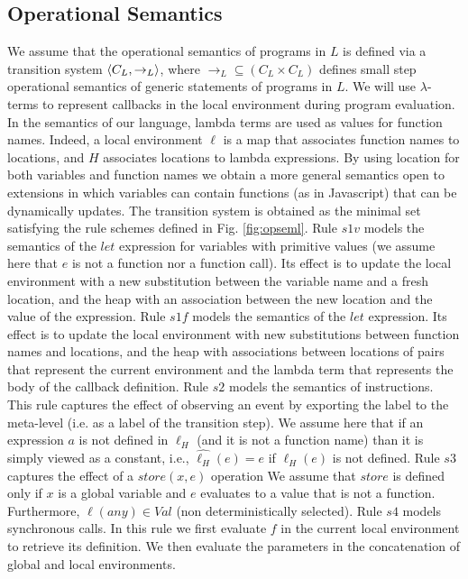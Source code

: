 \subsection{Operational Semantics}
We assume that the operational semantics of programs in $L$ is defined via a transition system  
$\langle C_L,\rightarrow_L \rangle$,  where $\rightarrow_L\subseteq (C_L\times C_L)$ defines small step operational semantics of generic statements of programs in $L$.
We will use $\lambda$-terms to represent callbacks in the local environment during program evaluation.  In the semantics of our language, lambda terms are used as values for function names. Indeed, a local environment $\ell$ is a map that associates function names  to locations, and $H$ associates locations to lambda expressions.
By using location for both variables and function names we obtain a more general semantics open to extensions in which variables can contain functions (as in Javascript) that can be dynamically updates. The transition system is obtained as the minimal set satisfying the rule schemes defined  in Fig. \ref{fig:opseml}.
Rule $s1v$ models the semantics of the $let$ expression for variables with primitive values 
(we assume here that $e$ is not a function nor a function call).
Its effect is to update the local environment with a new substitution between the variable name
and a fresh location, and the heap with an association between the new location and the value of the expression.
Rule $s1f$ models the semantics of the $let$ expression.
Its effect is to update the local environment with new substitutions between function names and locations, and the heap with associations between locations of pairs that represent the current environment and the lambda term that represents the body of the callback definition.
Rule $s2$ models the semantics of instructions.
This rule captures the effect of observing an event by exporting the label to the meta-level
(i.e. as a label of the transition step).
We assume here that if an expression $a$ is not defined in $\ell_H$ (and it is not a function name)
than it is simply viewed as a constant, i.e., $\widehat{\ell_H}(e)=e$ if $\ell_H(e)$ is not defined.
Rule $s3$ captures the effect of a $store(x,e)$ operation
We assume that $store$ is defined only if $x$ is a global variable and $e$ evaluates to a value that is not a function. Furthermore, $\ell(any)\in Val$ (non deterministically selected). 
Rule $s4$ models synchronous calls.
In this rule we first evaluate $f$ in the current local environment to retrieve its definition.
We then evaluate the parameters in the concatenation of global and local environments.
